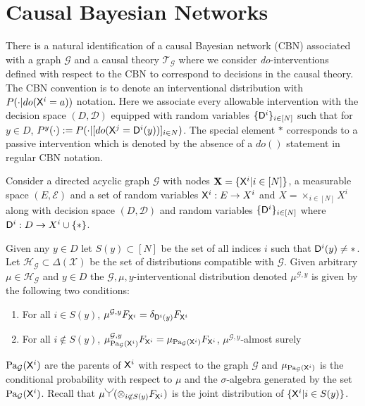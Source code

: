 \section{Causal Bayesian Networks}

There is a natural identification of a causal Bayesian network (CBN) associated with a graph $\mathcal{G}$ and a causal theory $\mathscr{T}_{\mathcal{G}}$ where we consider \emph{do}-interventions defined with respect to the CBN to correspond to decisions in the causal theory. The CBN convention is to denote an interventional distribution with $P(\cdot|do(\mathsf{X}^i=a))$ notation. Here we associate every allowable intervention with the decision space $(D,\mathcal{D})$ equipped with random variables $\{\mathsf{D}^i\}_{i\in[N]}$ such that for $y\in D$, $P^y(\cdot) := P(\cdot|[do(\mathsf{X}^j=\mathsf{D}^i(y))]_{i\in N})$. The special element $*$ corresponds to a passive intervention which is denoted by the absence of a $do()$ statement in regular CBN notation.

\begin{definition}\label{def:CBN}
Consider a directed acyclic graph $\mathcal{G}$ with nodes $\mathbf{X}=\{\mathsf{X}^i|i\in [N]\}$, a measurable space $(E,\mathcal{E})$ and a set of random variables $\mathsf{X}^i:E\to X^i$ and $X=\times_{i\in[N]} X^i$ along with decision space $(D,\mathcal{D})$ and random variables $\{\mathsf{D}^i\}_{i\in [N]}$ where $\mathsf{D}^i:D\to X^i\cup\{*\}$.

Given any $y\in D$ let $S(y)\subset[N]$ be the set of all indices $i$ such that $\mathsf{D}^i(y)\neq *$. Let $\mathscr{H}_\mathcal{G}\subset\Delta(\mathcal{X})$ be the set of distributions compatible with $\mathcal{G}$. Given arbitrary $\mu\in \mathscr{H}_\mathcal{G}$ and $y\in D$ the $\mathcal{G},\mu,y$-interventional distribution denoted $\mu^{\mathcal{G},y}$ is given by the following two conditions:
\begin{enumerate}
    \item For all $i\in S(y)$, $\mu^{\mathcal{G},y}F_{\mathsf{X}^i}=\delta_{\mathsf{D}^i(y)} F_{\mathsf{X}^i}$
    \item For all $i\not \in S(y)$, $\mu^{\mathcal{G},y}_{\text{Pa}_{\mathcal{G}}(\mathsf{X}^i)} F_{\mathsf{X}^i}=\mu_{\text{Pa}_{\mathcal{G}}(\mathsf{X}^i)}F_{\mathsf{X}^i} $, $\mu^{\mathcal{G},y}$-almost surely
\end{enumerate}
\end{definition}

$\text{Pa}_{\mathcal{G}}(\mathsf{X}^i)$ are the parents of $\mathsf{X}^i$ with respect to the graph $\mathcal{G}$ and $\mu_{\text{Pa}_{\mathcal{G}}(\mathsf{X}^i)}$ is the conditional probability with respect to $\mu$ and the $\sigma$-algebra generated by the set $\text{Pa}_{\mathcal{G}}(\mathsf{X}^i)$. Recall that $\mu \splitter{0.15}(\otimes_{i\not\in S(y)} F_{\RV{X}^i})$ is the joint distribution of $\{\mathsf{X}^i|i\in S(y)\}$.

